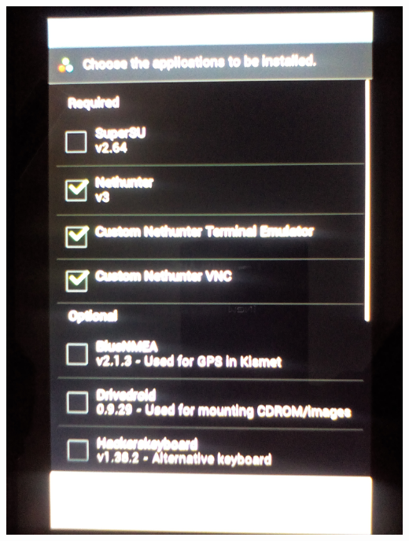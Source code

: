 \documentclass[11pt,a4paper]{article}
\begin{document}
\includegraphics[scale=0.09]{./Image/img16} \\ \\
\end{document}
